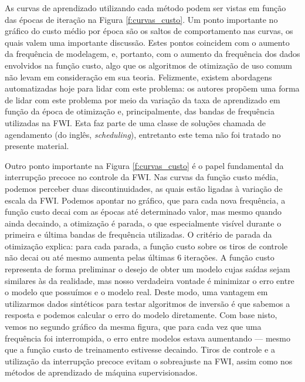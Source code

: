     As curvas de aprendizado utilizando cada método podem ser vistas em função das épocas de iteração na Figura \ref{f:curvas_custo}. Um ponto importante no gráfico do custo médio por época são os saltos de comportamento nas curvas, os quais valem uma importante discussão. Estes pontos coincidem com o aumento da frequência de modelagem, e, portanto, com o aumento da frequência dos dados envolvidos na função custo, algo que os algoritmos de otimização de uso comum não levam em consideração em sua teoria. Felizmente, existem abordagens automatizadas hoje para lidar com este problema: os autores  propõem uma forma de lidar com este problema por meio da variação da taxa de aprendizado em função da época de otimização e, principalmente, das bandas de frequência utilizadas na FWI. Esta faz parte de uma classe de soluções chamada de agendamento (do inglês, \textit{scheduling}), entretanto este tema não foi tratado no presente material.

    Outro ponto importante na Figura \ref{f:curvas_custo} é o papel fundamental da interrupção precoce no controle da FWI. Nas curvas da função custo média, podemos perceber duas discontinuidades, as quais estão ligadas à variação de escala da FWI. Podemos apontar no gráfico, que para cada nova frequência, a função custo decai com as épocas até determinado valor, mas mesmo quando ainda decaindo, a otimização é parada, o que especialmente visível durante o primeira e última bandas de frequência utilizadas. O critério de parada da otimização explica: para cada parada, a função custo sobre os tiros de controle não decai ou até mesmo aumenta pelas últimas 6 iterações. A função custo representa de forma preliminar o desejo de obter um modelo cujas saídas sejam similares às da realidade, mas nosso verdadeira vontade é minimizar o erro entre o modelo que possuímos e o modelo real. Deste modo, uma vantagem em utilizarmos dados sintéticos para testar algoritmos de inversão é que sabemos a resposta e podemos calcular o erro do modelo diretamente. Com base nisto, vemos no segundo gráfico da mesma figura, que para cada vez que uma frequência foi interrompida, o erro entre modelos estava aumentando --- mesmo que a função custo de treinamento estivesse decaindo. Tiros de controle e a utilização da interrupção precoce evitam o sobreajuste na FWI, assim como nos métodos de aprendizado de máquina supervisionados.

